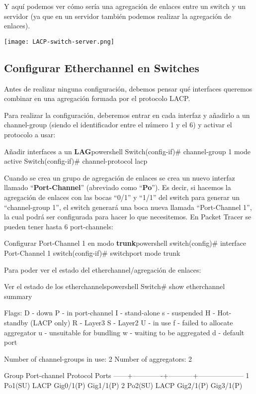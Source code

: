 Y aquí podemos ver cómo sería una agregación de enlaces entre un switch y un servidor (ya que en un servidor también podemos realizar la agregación de enlaces).

\begin{center}
    \vspace{-10pt}
    \texttt{[image: LACP-switch-server.png]}
    \vspace{-10pt}
\end{center}


\subsection{Configurar Etherchannel en Switches}
Antes de realizar ninguna configuración, debemos pensar qué interfaces queremos combinar en una agregación formada por el protocolo LACP.

Para realizar la configuración, deberemos entrar en cada interfaz y añadirlo a un channel-group (siendo el identificador entre el número 1 y el 6) y activar el protocolo a usar:


\begin{mycode}{Añadir interfaces a un \textbf{LAG}}{powershell}{}
Switch(config-if)# channel-group 1 mode active
Switch(config-if)# channel-protocol lacp
\end{mycode}

Cuando se crea un grupo de agregación de enlaces se crea un nuevo interfaz llamado “\textbf{Port-Channel}” (abreviado como “\textbf{Po}”). Es decir, si hacemos la agregación de enlaces con las bocas “0/1” y “1/1” del switch para generar un “channel-group 1”, el switch generará una boca nueva llamada “Port-Channel 1”, la cual podrá ser configurada para hacer lo que necesitemos. En Packet Tracer se pueden tener hasta 6 port-channels:

\begin{mycode}{Configurar Port-Channel 1 en modo \textbf{trunk}}{powershell}{}
switch(config)# interface Port-Channel 1
switch(config-if)# switchport mode trunk
\end{mycode}


Para poder ver el estado del etherchannel/agregación de enlaces:

\begin{mycode}{Ver el estado de los etherchannels}{powershell}{}
Switch# show etherchannel summary

Flags:  D - down        P - in port-channel
I - stand-alone s - suspended
H - Hot-standby (LACP only)
R - Layer3      S - Layer2
U - in use      f - failed to allocate aggregator
u - unsuitable for bundling
w - waiting to be aggregated
d - default port

Number of channel-groups in use: 2
Number of aggregators:           2

Group  Port-channel   Protocol   Ports
------+-------------+-----------+--------------------
1      Po1(SU)           LACP     Gig0/1(P) Gig1/1(P)
2      Po2(SU)           LACP     Gig2/1(P) Gig3/1(P)
\end{mycode}

